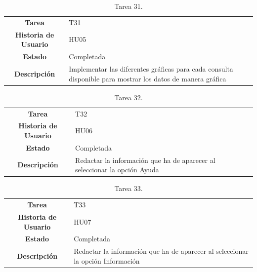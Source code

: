 \begin{table}[H]
	\begin{center}
		\begin{tabular}{| c | p{9cm} |}
			\hline
			
			\textbf{Tarea} & T31 \\
			\textbf{Historia de Usuario} & HU05 \\
			\textbf{Estado} & Completada \\
			\textbf{Descripción} & Implementar las diferentes gráficas para cada consulta disponible para mostrar los datos de manera gráfica \\ \hline
		\end{tabular}
		\caption{Tarea 31.}
	\end{center}
\end{table}

\begin{table}[H]
	\begin{center}
		\begin{tabular}{| c | p{9cm} |}
			\hline
			
			\textbf{Tarea} & T32 \\
			\textbf{Historia de Usuario} & HU06 \\
			\textbf{Estado} & Completada \\
			\textbf{Descripción} & Redactar la información que ha de aparecer al seleccionar la opción Ayuda \\ \hline
		\end{tabular}
		\caption{Tarea 32.}
	\end{center}
\end{table}

\begin{table}[H]
	\begin{center}
		\begin{tabular}{| c | p{9cm} |}
			\hline
			
			\textbf{Tarea} & T33 \\
			\textbf{Historia de Usuario} & HU07 \\
			\textbf{Estado} & Completada \\
			\textbf{Descripción} & Redactar la información que ha de aparecer al seleccionar la opción Información \\ \hline
		\end{tabular}
		\caption{Tarea 33.}
	\end{center}
\end{table}

